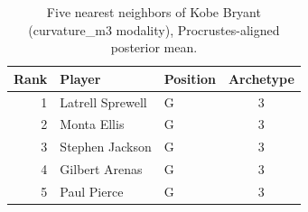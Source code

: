 \begin{table}[htbp]
  \centering\small
  \begin{tabular}{rllc}
    \toprule
    Rank & Player & Position & Archetype \\
    \midrule
    1 & Latrell Sprewell & G & 3 \\
    2 & Monta Ellis & G & 3 \\
    3 & Stephen Jackson & G & 3 \\
    4 & Gilbert Arenas & G & 3 \\
    5 & Paul Pierce & G & 3 \\
    \bottomrule
  \end{tabular}
  \caption{Five nearest neighbors of Kobe Bryant (curvature_m3 modality), Procrustes-aligned posterior mean.}
  \label{tab:Kobe_Bryant_neighbors_curvature_m3}
\end{table}

